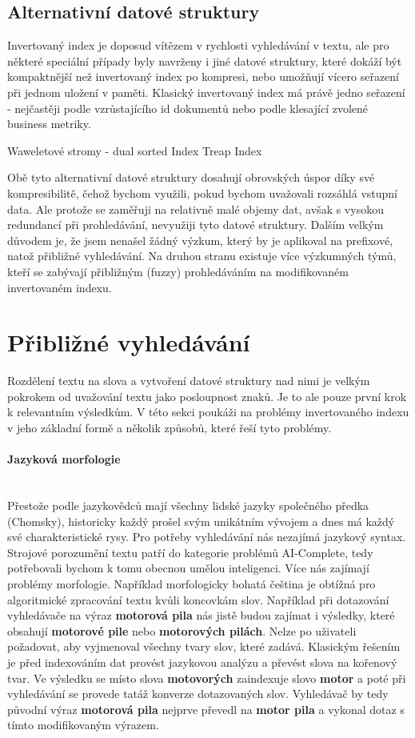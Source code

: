 \documentclass[11pt]{article}
\begin{document}

\subsection{Alternativní datové struktury}
Invertovaný index je doposud vítězem v rychlosti vyhledávání v textu,
ale pro některé speciální případy byly navrženy i jiné datové struktury,
které dokáží být kompaktnější než invertovaný index po kompresi, nebo
umožňují vícero seřazení při jednom uložení v paměti. Klasický
invertovaný index má právě jedno seřazení - nejčastěji podle
vzrůstajícího id dokumentů nebo podle klesající zvolené business
metriky.

Waweletové stromy - dual sorted Index Treap Index

Obě tyto alternativní datové struktury dosahují obrovských úspor díky
své kompresibilitě, čehož bychom využili, pokud bychom uvažovali
rozsáhlá vstupní data. Ale protože se zaměřuji na relativně malé objemy
dat, avšak s vysokou redundancí při prohledávání, nevyužiji tyto datové
struktury. Dalším velkým důvodem je, že jsem nenašel žádný výzkum, který
by je aplikoval na prefixové, natož přibližné vyhledávání. Na druhou
stranu existuje více výzkumných týmů, kteří se zabývají přibližným
(fuzzy) prohledáváním na modifikovaném invertovaném indexu.

\section{Přibližné vyhledávání}
Rozdělení textu na slova a vytvoření datové struktury nad nimi je velkým
pokrokem od uvažování textu jako posloupnost znaků. Je to ale pouze první krok
k relevantním výsledkům. V této sekci poukáži na problémy invertovaného indexu
v jeho základní formě a několik způsobů, které řeší tyto problémy.

\paragraph{Jazyková morfologie}\mbox{}\\
Přestože podle jazykovědců mají všechny lidské jazyky společného předka
(Chomsky), historicky každý prošel svým unikátním vývojem a dnes má každý své
charakteristické rysy. Pro potřeby vyhledávání nás nezajímá jazykový syntax.
Strojové porozumění textu patří do kategorie problémů AI-Complete, tedy
potřebovali bychom k tomu obecnou umělou inteligenci. Více nás zajímají
problémy morfologie. Například morfologicky bohatá čeština je obtížná pro
algoritmické zpracování textu kvůli koncovkám slov. Například při dotazování
vyhledávače na výraz \textbf{motorová pila} nás jistě budou zajímat i výsledky,
které obsahují \textbf{motorové pile} nebo \textbf{motorových pilách}. Nelze po
uživateli požadovat, aby vyjmenoval všechny tvary slov, které zadává. Klasickým
řešením je před indexováním dat provést jazykovou analýzu a převést slova na
kořenový tvar. Ve výsledku se místo slova \textbf{motovorých} zaindexuje slovo
\textbf{motor} a poté při vyhledávání se provede tatáž konverze dotazovaných
slov. Vyhledávač by tedy původní výraz \textbf{motorová pila} nejprve převedl
na \textbf{motor pila} a vykonal dotaz s tímto modifikovaným výrazem.
\end{document}
